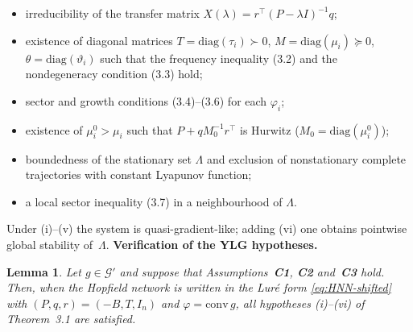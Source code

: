 \documentclass[journal]{IEEEtran}
\newtheorem{lemma}{Lemma}
\begin{document}
\begin{itemize}
  \item[(i)] irreducibility of the transfer matrix
    $X(\lambda)=r^{\top}(P-\lambda I)^{-1}q$;

  \item[(ii)] existence of diagonal matrices
    $T=\mathrm{diag}(\tau_i)\succ0$,
    $M=\mathrm{diag}(\mu_i)\succeq0$,
    $\theta=\mathrm{diag}(\vartheta_i)$ such that the frequency
    inequality (3.2) and the nondegeneracy condition (3.3) hold;

  \item[(iii)] sector and growth conditions (3.4)–(3.6) for each
    $\varphi_i$;

  \item[(iv)] existence of $\mu_i^0>\mu_i$ such that
    $P+qM_0^{-1}r^{\top}$ is Hurwitz ($M_0=\mathrm{diag}(\mu_i^0)$);

  \item[(v)] boundedness of the stationary set $\Lambda$ and exclusion
    of nonstationary complete trajectories with constant Lyapunov
    function;

  \item[(vi)] a local sector inequality (3.7) in a neighbourhood of
    $\Lambda$.
\end{itemize}

Under (i)–(v) the system is quasi-gradient-like; adding (vi) one
obtains pointwise global stability of~$\Lambda$.
\medskip
\noindent
\textbf{Verification of the YLG hypotheses.}

\begin{lemma}\label{lem:YLG-conditions}
Let $g\in\mathcal G'$ and suppose that Assumptions~\textbf{C1},
\textbf{C2} and~\textbf{C3} hold.  Then, when the Hopfield network
is written in the Lur\'e form \eqref{eq:HNN-shifted} with
$(P,q,r)=(-B,T,I_n)$ and $\varphi=\mathrm{conv}\,g$, all hypotheses
\textup{(i)}–\textup{(vi)} of Theorem~3.1 are satisfied.
\end{lemma}
\end{document}
